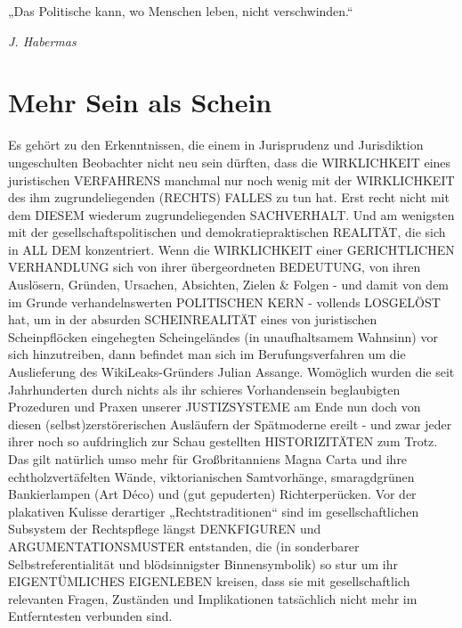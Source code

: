 \begin{multicols}{2}

\epigraph{„Das Politische kann, wo Menschen leben, nicht verschwinden.“}{\textit{J. Habermas}}



\chapter{Mehr Sein als Schein}
Es gehört zu den Erkenntnissen, die einem in Jurisprudenz und Jurisdiktion ungeschulten Beobachter nicht
neu sein dürften, dass die WIRKLICHKEIT eines juristischen VERFAHRENS manchmal nur noch wenig mit der
WIRKLICHKEIT des ihm zugrundeliegenden (RECHTS)
FALLES zu tun hat. Erst recht nicht mit dem DIESEM
wiederum zugrundeliegenden SACHVERHALT. Und am
wenigsten mit der gesellschaftspolitischen und demokratiepraktischen REALITÄT, die sich in ALL DEM konzentriert.
Wenn die WIRKLICHKEIT einer GERICHTLICHEN VERHANDLUNG sich von ihrer übergeordneten BEDEUTUNG, von ihren Auslösern, Gründen, Ursachen, Absichten, Zielen \& Folgen - und damit von dem im Grunde
verhandelnswerten POLITISCHEN KERN - vollends
LOSGELÖST hat, um in der absurden SCHEINREALITÄT eines von juristischen Scheinpflöcken eingehegten
Scheingeländes (in unaufhaltsamem Wahnsinn) vor sich
hinzutreiben, dann befindet man sich im Berufungsverfahren um die Auslieferung des WikiLeaks-Gründers
Julian Assange.
Womöglich wurden die seit Jahrhunderten durch nichts
als ihr schieres Vorhandensein beglaubigten Prozeduren und Praxen unserer JUSTIZSYSTEME am Ende nun
doch von diesen (selbst)zerstörerischen Ausläufern der
Spätmoderne ereilt - und zwar jeder ihrer noch so aufdringlich zur Schau gestellten HISTORIZITÄTEN zum
Trotz. Das gilt natürlich umso mehr für Großbritanniens
Magna Carta und ihre echtholzvertäfelten Wände, viktorianischen Samtvorhänge, smaragdgrünen Bankierlampen (Art Déco) und (gut gepuderten) Richterperücken.
Vor der plakativen Kulisse derartiger „Rechtstraditionen“
sind im gesellschaftlichen Subsystem der Rechtspflege
längst DENKFIGUREN und ARGUMENTATIONSMUSTER entstanden, die (in sonderbarer Selbstreferentialität und blödsinnigster Binnensymbolik) so stur um ihr
EIGENTÜMLICHES EIGENLEBEN kreisen, dass sie mit
gesellschaftlich relevanten Fragen, Zuständen und Implikationen tatsächlich nicht mehr im Entferntesten verbunden sind.



\end{multicols}
